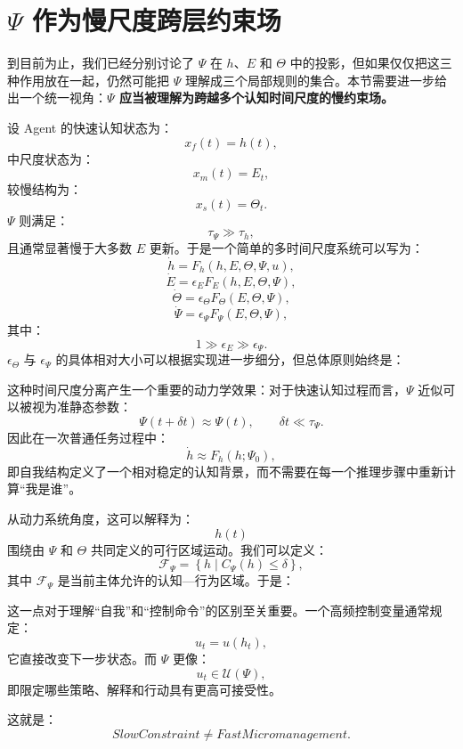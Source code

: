 \section{$\Psi$ 作为慢尺度跨层约束场}

到目前为止，我们已经分别讨论了 $\Psi$ 在 $h$、$E$ 和 $\Theta$ 中的投影，但如果仅仅把这三种作用放在一起，仍然可能把 $\Psi$ 理解成三个局部规则的集合。本节需要进一步给出一个统一视角：\textbf{$\Psi$ 应当被理解为跨越多个认知时间尺度的慢约束场。}

设 Agent 的快速认知状态为：
\[
x_f(t)=h(t),
\]
中尺度状态为：
\[
x_m(t)=E_t,
\]
较慢结构为：
\[
x_s(t)=\Theta_t.
\]
$\Psi$ 则满足：
\[
\tau_\Psi
\gg
\tau_h,
\]
且通常显著慢于大多数 $E$ 更新。于是一个简单的多时间尺度系统可以写为：
\[
\dot h
=
F_h
\left(
h,E,\Theta,\Psi,u
\right),
\]
\[
\dot E
=
\epsilon_E
F_E
\left(
h,E,\Theta,\Psi
\right),
\]
\[
\dot\Theta
=
\epsilon_\Theta
F_\Theta
\left(
E,\Theta,\Psi
\right),
\]
\[
\dot\Psi
=
\epsilon_\Psi
F_\Psi
\left(
E,\Theta,\Psi
\right),
\]
其中：
\[
1
\gg
\epsilon_E
\gg
\epsilon_\Psi.
\]
$\epsilon_\Theta$ 与 $\epsilon_\Psi$ 的具体相对大小可以根据实现进一步细分，但总体原则始终是：
\begin{statementbox}
\centering
{}
\end{statementbox}

这种时间尺度分离产生一个重要的动力学效果：对于快速认知过程而言，$\Psi$ 近似可以被视为准静态参数：
\[
\Psi(t+\delta t)
\approx
\Psi(t),
\qquad
\delta t\ll\tau_\Psi.
\]
因此在一次普通任务过程中：
\[
\dot h
\approx
F_h(h;\Psi_0),
\]
即自我结构定义了一个相对稳定的认知背景，而不需要在每一个推理步骤中重新计算“我是谁”。

从动力系统角度，这可以解释为：
\[
h(t)
\]
围绕由 $\Psi$ 和 $\Theta$ 共同定义的可行区域运动。我们可以定义：
\[
\mathcal F_\Psi
=
\left\{
h\mid
C_\Psi(h)\leq \delta
\right\},
\]
其中 $\mathcal F_\Psi$ 是当前主体允许的认知—行为区域。于是：
\begin{statementbox}
\centering
{}
\end{statementbox}

这一点对于理解“自我”和“控制命令”的区别至关重要。一个高频控制变量通常规定：
\[
u_t=u(h_t),
\]
它直接改变下一步状态。而 $\Psi$ 更像：
\[
u_t\in\mathcal U(\Psi),
\]
即限定哪些策略、解释和行动具有更高可接受性。

这就是：
\[
\boxed{
SlowConstraint
\neq
FastMicromanagement.
}
\]

